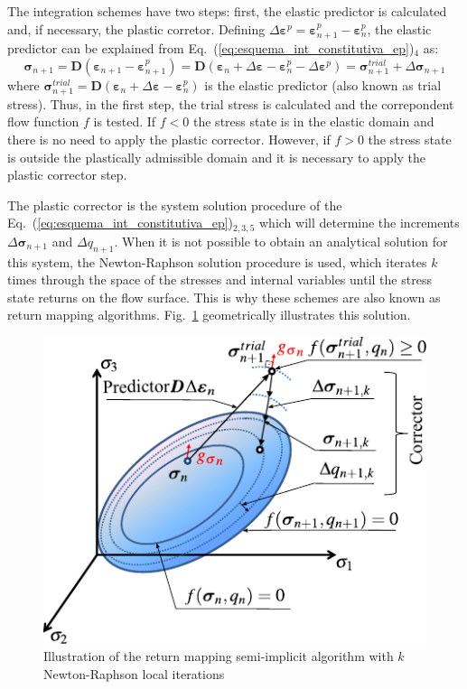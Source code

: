 \documentclass[Journal,letterpaper]{ascelike-new}
\newcommand{\Dsdee}{\boldsymbol{D}}
\newcommand{\strain}{\boldsymbol{\varepsilon}}
\newcommand{\strainp}{\boldsymbol{\varepsilon}^{p}}
\newcommand{\stress}{\boldsymbol{\sigma}}
\begin{document}
The integration schemes have two steps: first, the elastic predictor is calculated and, if necessary, the plastic corretor. Defining  $\Delta \strainp = \strainp_{n+1} - \strainp_{n}$, the elastic predictor can be explained from Eq.~(\ref{eq:esquema_int_constitutiva_ep})$_4$ as: 
\begin{equation}
	\label{eq:preditor_elastico}
	\stress_{n+1} = \Dsdee(\strain_{n+1}-\strain_{n+1}^p) = \Dsdee(\strain_n+\Delta \strain-\strain_{n}^ p-\Delta \strain^p) = \stress_{n+1}^{trial} + \Delta \stress_{n+1}
\end{equation}
where $\stress_{n+1}^{trial} = \Dsdee (\strain_n+\Delta \strain-\strain_{n}^ p)$ is the elastic predictor (also known as trial stress). Thus, in the first step, the trial stress is calculated and the correpondent flow function $f$ is tested. If  $f<0$  the stress state is in the elastic domain and there is no need to apply the plastic corrector. However, if $f>0$ the stress state is outside the plastically admissible domain and it is necessary to apply the plastic corrector step.

The plastic corrector is the system solution procedure of the Eq.~(\ref{eq:esquema_int_constitutiva_ep})$_{2,3,5}$ which will determine the increments $\Delta \stress_{n+1}$ and $\Delta q_{n+1}$. When it is not possible to obtain an analytical solution for this system, the Newton-Raphson solution procedure is used, which iterates $k$ times through the space of the stresses and internal variables until the stress state returns on the flow surface. This is why these schemes are also known as return mapping algorithms. Fig.~\ref{ep-algorithm-representation} geometrically illustrates this solution.

\begin{figure}
	\centering
	\includegraphics[scale=1]{FIG3.pdf}
	\caption{Illustration of the return mapping semi-implicit algorithm with $k$ Newton-Raphson local iterations}
	\label{ep-algorithm-representation}
\end{figure}
\end{document}
